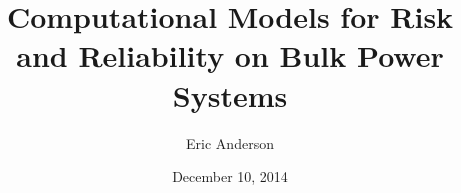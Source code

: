 

\title{Computational Models for Risk and Reliability on Bulk Power Systems}
\author{Eric Anderson}%
\date{December 10, 2014}








%




